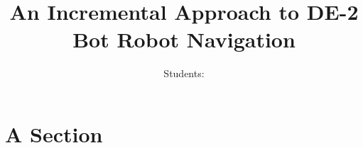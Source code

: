 \documentclass[12pt,conference,onecolumn]{IEEEtran} %
\begin{document}
\title{\vspace*{70mm}
An Incremental Approach to DE-2 Bot Robot Navigation}

\author{Students: 
}

\maketitle

\pagebreak{}

 

\section{A Section}


\pagebreak
\printbibliography{}
\end{document}
